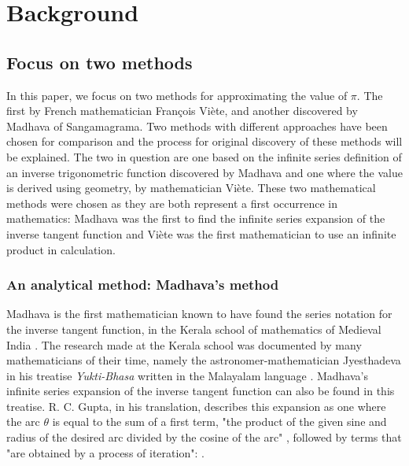 \section{Background}

\subsection{Focus on two methods}

In this paper, we focus on two methods for approximating the value of $\pi$. 
The first by French mathematician François Viète, and another discovered by Madhava of Sangamagrama. Two methods with different 
approaches have been chosen for comparison and the process for original discovery of these methods
will be explained. The two in question are one based on 
the infinite series definition of an inverse trigonometric function discovered by Madhava
and one where the value is derived using geometry, by mathematician 
Viète. These two mathematical methods were chosen as they are both 
represent a first occurrence in mathematics: Madhava was the first to 
find the infinite series expansion of the inverse tangent function and Viète was 
the first mathematician to use an infinite product in calculation. 


\subsubsection{An analytical method: Madhava's method}

Madhava is the first mathematician known to have found the series notation for 
the inverse tangent function, in the Kerala school of mathematics of Medieval India 
\cite{amermathmonthly}. The research made at the Kerala school was documented by 
many mathematicians of their time, namely the astronomer-mathematician Jyesthadeva 
in his treatise \textit{Yukti-Bhasa} written in the Malayalam language \cite{oconnor_robertson_2000}. 
Madhava's infinite series expansion of the inverse tangent function can also be 
found in this treatise. R. C. Gupta, in his translation, describes this expansion as one 
where the arc $\theta$ is equal to the sum of a first term, "the product of the given sine 
and radius of the desired arc divided by the cosine of the arc" \footnotemark, followed by terms that "are 
obtained by a process of iteration": . \cite{rc_gupta_mgseries}



